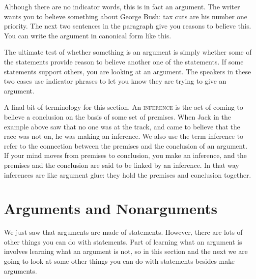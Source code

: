 Although there are no indicator words, this is in fact an argument. The writer wants you to believe something about George Bush: tax cuts are his number one priority. The next two sentences in the paragraph give you reasons to believe this. You can write the argument in canonical form like this.

\begin{kormanize}
\end{kormanize}

The ultimate test of whether something is an argument is simply whether some of the statements provide reason to believe another one of the statements. If some statements support others, you are looking at an argument. The speakers in these two cases use indicator phrases to let you know they are trying to give an argument.

A final bit of terminology for this section. An \textsc{\gls{inference}} \label{def:Inference} is the act of coming to believe a conclusion on the basis of some set of premises. When Jack in the example above saw that no one was at the track, and came to believe that the race was not on, he was making an inference. We also use the term inference to refer to the connection between the premises and the conclusion of an argument. If your mind moves from premises to conclusion, you make an inference, and the premises and the conclusion are said to be linked by an inference. In that way inferences are like argument glue: they hold the premises and conclusion together.




\section{Arguments and Nonarguments}\label{sec:arguments_and_nonarguments}

We just saw that arguments are made of statements. However, there are lots of other things you can do with statements. Part of learning what an argument is involves learning what an argument is not, so in this section and the next we are going to look at some other things you can do with statements besides make arguments.

